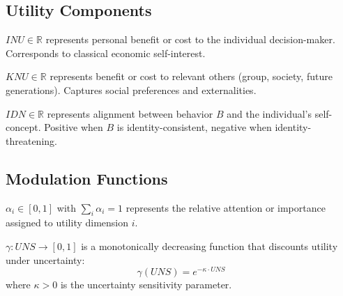 \subsection{Utility Components}

\begin{definition}
\label{def:inu}
$INU \in \mathbb{R}$ represents personal benefit or cost to the individual decision-maker. Corresponds to classical economic self-interest.
\end{definition}

\begin{definition}
\label{def:knu}
$KNU \in \mathbb{R}$ represents benefit or cost to relevant others (group, society, future generations). Captures social preferences and externalities.
\end{definition}

\begin{definition}
\label{def:idn}
$IDN \in \mathbb{R}$ represents alignment between behavior $B$ and the individual's self-concept. Positive when $B$ is identity-consistent, negative when identity-threatening.
\end{definition}


\subsection{Modulation Functions}

\begin{definition}
\label{def:alpha}
$\alpha_i \in [0,1]$ with $\sum_i \alpha_i = 1$ represents the relative attention or importance assigned to utility dimension $i$.
\end{definition}

\begin{definition}
\label{def:gamma}
$\gamma: UNS \rightarrow [0,1]$ is a monotonically decreasing function that discounts utility under uncertainty:
\begin{equation}
\gamma(UNS) = e^{-\kappa \cdot UNS}
\end{equation}
where $\kappa > 0$ is the uncertainty sensitivity parameter.
\end{definition}

